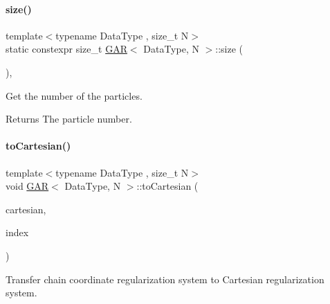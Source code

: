 \paragraph{\texorpdfstring{size()}{size()}}
{\footnotesize\ttfamily template$<$typename Data\+Type , size\+\_\+t N$>$ \\
static constexpr size\+\_\+t \mbox{\hyperlink{class_g_a_r}{G\+AR}}$<$ Data\+Type, N $>$\+::size (\begin{DoxyParamCaption}{ }\end{DoxyParamCaption})\hspace{0.3cm}{\ttfamily [inline]}, {\ttfamily [static]}}



Get the number of the particles. 

\begin{DoxyReturn}{Returns}
The particle number. 
\end{DoxyReturn}
\mbox{\label{class_g_a_r_a2a282218e90ffb1a367da364b70e54a3}} 
\paragraph{\texorpdfstring{to\+Cartesian()}{toCartesian()}}
{\footnotesize\ttfamily template$<$typename Data\+Type , size\+\_\+t N$>$ \\
void \mbox{\hyperlink{class_g_a_r}{G\+AR}}$<$ Data\+Type, N $>$\+::to\+Cartesian (\begin{DoxyParamCaption}\item[{\mbox{\hyperlink{class_g_a_r}{G\+AR}}$<$ Data\+Type, N $>$ \&}]{cartesian,  }\item[{\mbox{\hyperlink{class_g_a_r_aaf033049c0cd8f0f86a82b9595086fa5}{Index\+Array}} \&}]{index }\end{DoxyParamCaption})\hspace{0.3cm}{\ttfamily [inline]}}



Transfer chain coordinate regularization system to Cartesian regularization system. 

